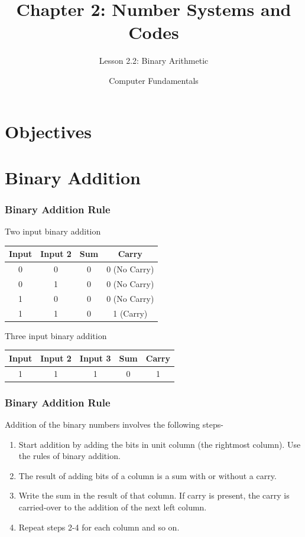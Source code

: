 \documentclass{beamer}
\title{Chapter 2: Number Systems and Codes
}
\subtitle{Lesson 2.2: Binary Arithmetic}
\author{Computer Fundamentals}
\institute{Second Edition}
\date{\small{}}
\begin{document}
\frame{\titlepage}

\section{Objectives}
\section{Binary Addition }
\frame
{\frametitle {Binary Addition Rule}
Two input binary addition
\begin{tabular}{|c|c|c|c|}
        \hline
        Input &Input 2&Sum &Carry \\ \hline
        0 & 0&0&0 (No Carry)\\ \hline
        0 & 1&0&0 (No Carry)\\ \hline
        1 & 0&0&0 (No Carry)\\ \hline
        1 & 1& 0& 1 (Carry)\\ \hline
        \end{tabular}

Three input binary addition
\begin{tabular}{|c|c|c|c|c|}
        \hline
        Input &Input 2 &Input 3&Sum &Carry \\ \hline
        1 & 1&1&0&1 \\ \hline
        \end{tabular}

}


\frame
{\frametitle {Binary Addition Rule}
Addition of the binary numbers involves the following steps-
\begin{enumerate}
  \item Start addition by adding the bits in unit column (the rightmost column). Use the rules of binary addition.
  \item The result of adding bits of a column is a sum with or without a carry.
  \item Write the sum in the result of that column. If carry is present, the carry is carried-over to the addition of the next left column.
  \item Repeat steps 2-4 for each column and so on.
\end{enumerate}
}
\end{document}
